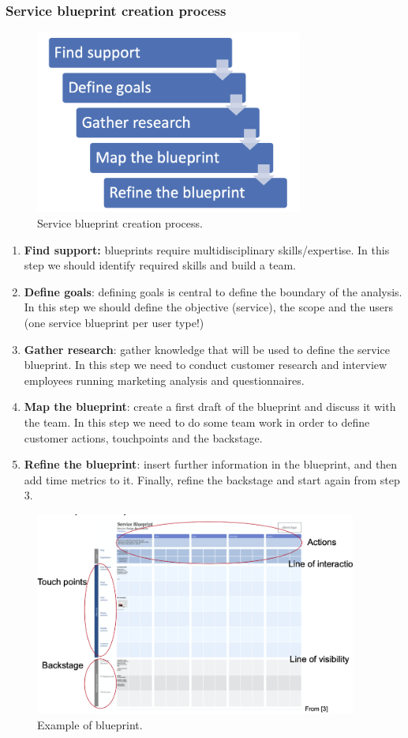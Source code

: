 \documentclass[10pt,a4paper]{article}
\begin{document}
\subsubsection{Service blueprint creation process}
\begin{figure}[ht!]
 \hfill \includegraphics[width=250pt]{images/blueprint-creation}\hspace*{\fill}
 \caption{Service blueprint creation process.}
  \label{fig:blueprint-creation}
\end{figure}
\begin{enumerate}
	\item \textbf{Find support:} blueprints require multidisciplinary skills/expertise. In this step we should identify required skills and build a team.
	\item \textbf{Define goals}: defining goals is central to define the boundary of the analysis. In this step we should define the objective (service), the scope and the users (one service blueprint per user type!)
	\item \textbf{Gather research}: gather knowledge that will be used to define the service blueprint. In this step we need to conduct customer research and interview employees running marketing analysis and questionnaires.
	\item \textbf{Map the blueprint}: create a first draft of the blueprint and discuss it with the team. In this step we need to do some team work in order to define customer actions, touchpoints and the backstage.
	\item \textbf{Refine the blueprint}: insert further information in the blueprint, and then add time metrics to it. Finally, refine the backstage and start again from step 3.
\end{enumerate}
\pagebreak
\begin{figure}[ht!]
 \hfill \includegraphics[width=300pt]{images/blueprint-example}\hspace*{\fill}
 \caption{Example of blueprint.}
  \label{fig:example-blueprint}
\end{figure}
\end{document}
